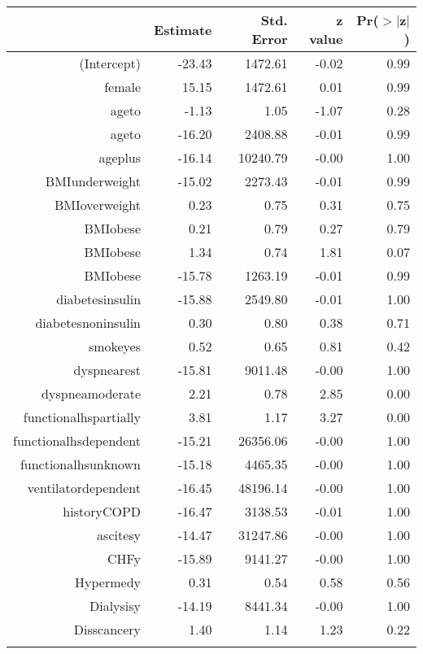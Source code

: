 \bigskip\bigskip
\centering
\begin{tabular}{rrrrr}
  \hline
 & Estimate & Std. Error & z value & Pr($>$$|$z$|$) \\ 
  \hline
(Intercept) & -23.43 & 1472.61 & -0.02 & 0.99 \\ 
  female & 15.15 & 1472.61 & 0.01 & 0.99 \\ 
  age\-65\-to\-74 & -1.13 & 1.05 & -1.07 & 0.28 \\ 
  age\-75\-to\-84 & -16.20 & 2408.88 & -0.01 & 0.99 \\ 
  age\-85\-plus & -16.14 & 10240.79 & -0.00 & 1.00 \\ 
  BMI\-underweight & -15.02 & 2273.43 & -0.01 & 0.99 \\ 
  BMI\-overweight & 0.23 & 0.75 & 0.31 & 0.75 \\ 
  BMI\-obese\-1 & 0.21 & 0.79 & 0.27 & 0.79 \\ 
  BMI\-obese\-2 & 1.34 & 0.74 & 1.81 & 0.07 \\ 
  BMI\-obese\-3 & -15.78 & 1263.19 & -0.01 & 0.99 \\ 
  diabetes\-insulin & -15.88 & 2549.80 & -0.01 & 1.00 \\ 
  diabetes\-noninsulin & 0.30 & 0.80 & 0.38 & 0.71 \\ 
  smoke\-yes & 0.52 & 0.65 & 0.81 & 0.42 \\ 
  dyspnea\-rest & -15.81 & 9011.48 & -0.00 & 1.00 \\ 
  dyspnea\-moderate & 2.21 & 0.78 & 2.85 & 0.00 \\ 
  functional\-hs\-partially & 3.81 & 1.17 & 3.27 & 0.00 \\ 
  functional\-hs\-dependent & -15.21 & 26356.06 & -0.00 & 1.00 \\ 
  functional\-hs\-unknown & -15.18 & 4465.35 & -0.00 & 1.00 \\ 
  ventilator\-dependent & -16.45 & 48196.14 & -0.00 & 1.00 \\ 
  history\-COPD & -16.47 & 3138.53 & -0.01 & 1.00 \\ 
  ascites\-y & -14.47 & 31247.86 & -0.00 & 1.00 \\ 
  CHF\-y & -15.89 & 9141.27 & -0.00 & 1.00 \\ 
  Hyper\-med\-y & 0.31 & 0.54 & 0.58 & 0.56 \\ 
  Dialysis\-y & -14.19 & 8441.34 & -0.00 & 1.00 \\ 
  Diss\-cancer\-y & 1.40 & 1.14 & 1.23 & 0.22 \\ 
$$
\end{tabular}
